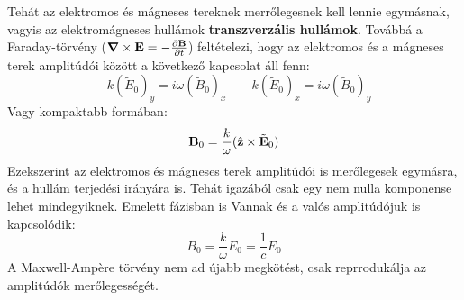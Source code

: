 \documentclass[../main.tex]{subfiles}
\begin{document}
Tehát az elektromos és mágneses tereknek merrőlegesnek kell lennie egymásnak, vagyis az elektromágneses hullámok \textbf{transzverzális hullámok}.
Továbbá a Faraday-törvény ($\boldsymbol{\nabla} \times \bold{E} = -\frac{\partial \bold{B}}{\partial t}$) feltételezi, hogy az elektromos és a mágneses terek amplitúdói között a következő kapcsolat áll fenn:
\begin{equation}
    -k(\tilde{E}_0)_y = i \omega (\tilde{B}_0)_x \qquad k(\tilde{E}_0)_x = i \omega (\tilde{B}_0)_y
\end{equation}
Vagy kompaktabb formában:
\begin{equation}
    \bold{B}_0 = \frac{k}{\omega} (\hat{\bold{z}} \times \tilde{\bold{E}}_0)
\end{equation}
Ezekszerint az elektromos és mágneses terek amplitúdói is merőlegesek egymásra, és a hullám terjedési irányára is. Tehát igazából csak egy nem nulla komponense lehet mindegyiknek. Emelett fázisban is Vannak
és a valós amplitúdójuk is kapcsolódik:
\begin{equation}
    B_0 = \frac{k}{\omega} E_0 = \frac{1}{c} E_0
\end{equation}
A Maxwell-Ampère törvény nem ad újabb megkötést, csak reprrodukálja az amplitúdók merőlegességét.
\end{document}
